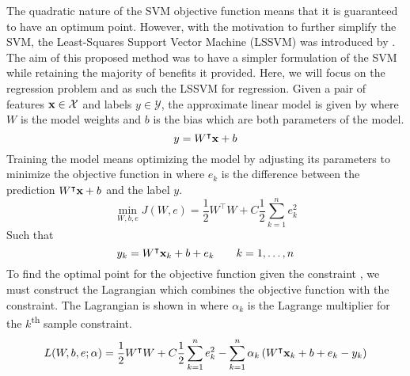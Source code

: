 The quadratic nature of the SVM objective function means that it is guaranteed to have an optimum point. However, with the motivation to further simplify the SVM, the Least-Squares Support Vector Machine (LSSVM) was introduced by \textcite{suykensLeastSquaresSupport2005}. The aim of this proposed method was to have a simpler formulation of the SVM while retaining the majority of benefits it provided. Here, we will focus on the regression problem and as such the LSSVM for regression. Given a pair of features \(\vb{x}\in\mathcal{X}\) and labels \(y\in\mathcal{Y}\), the approximate linear model is given by  where \(W\) is the model weights and \(b\) is the bias which are both parameters of the model.
\begin{equation}
  y=W^{\intercal}\vb{x}+b\label{eq:lssvr_primal_linear_model}
\end{equation}
Training the model means optimizing the model by adjusting its parameters to minimize the objective function in  where \(e_k\) is the difference between the prediction \(W^{\intercal}\vb{x}+b\) and the label \(y\).
\begin{equation}
  \min_{W,b,e} J(W,e) = \frac{1}{2}W^{\intercal}W + C\frac{1}{2}\sum_{k=1}^{n}e_{k}^{2}\label{eq:lssvr_primal_objective}
\end{equation}
Such that
\begin{equation}
  y_{k}=W^{\intercal}\vb{x}_{k}+b+e_{k} \qquad k=1,\dots,n\label{eq:lssvr_primal_constraint}
\end{equation}
To find the optimal point for the objective function given the constraint , we must construct the Lagrangian which combines the objective function with the constraint. The Lagrangian is shown in  where \(\alpha_{k}\) is the Lagrange multiplier for the \(k\)\textsuperscript{th} sample constraint.
\begin{equation}
  L(W,b,e;\vb{\alpha}) = \frac{1}{2}W^{\intercal}W + C\frac{1}{2}\sum_{k=1}^{n}e_{k}^{2} - \sum_{k=1}^{n}\alpha_{k} \left(W^{\intercal}\vb{x}_{k}+b+e_{k} - y_{k} \right)\label{eq:lssvr_primal_lagrangian}
\end{equation}


